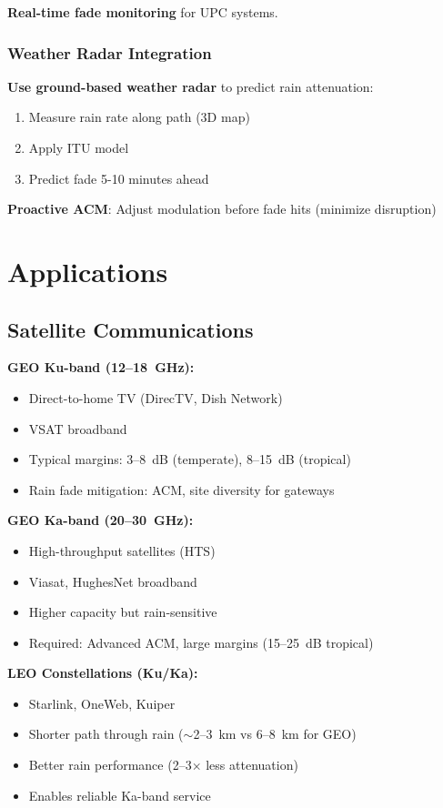\textbf{Real-time fade monitoring} for UPC systems.

\subsubsection{Weather Radar Integration}

\textbf{Use ground-based weather radar} to predict rain attenuation:

\begin{enumerate}
\def\labelenumi{\arabic{enumi}.}
\tightlist
\item
  Measure rain rate along path (3D map)
\item
  Apply ITU model
\item
  Predict fade 5-10 minutes ahead
\end{enumerate}

\textbf{Proactive ACM}: Adjust modulation before fade hits (minimize disruption)

\section{Applications}

\subsection{Satellite Communications}

\textbf{GEO Ku-band (12--18~GHz):}
\begin{itemize}
\item Direct-to-home TV (DirecTV, Dish Network)
\item VSAT broadband
\item Typical margins: 3--8~dB (temperate), 8--15~dB (tropical)
\item Rain fade mitigation: ACM, site diversity for gateways
\end{itemize}

\textbf{GEO Ka-band (20--30~GHz):}
\begin{itemize}
\item High-throughput satellites (HTS)
\item Viasat, HughesNet broadband
\item Higher capacity but rain-sensitive
\item Required: Advanced ACM, large margins (15--25~dB tropical)
\end{itemize}

\textbf{LEO Constellations (Ku/Ka):}
\begin{itemize}
\item Starlink, OneWeb, Kuiper
\item Shorter path through rain ($\sim$2--3~km vs 6--8~km for GEO)
\item Better rain performance (2--3$\times$ less attenuation)
\item Enables reliable Ka-band service
\end{itemize}

